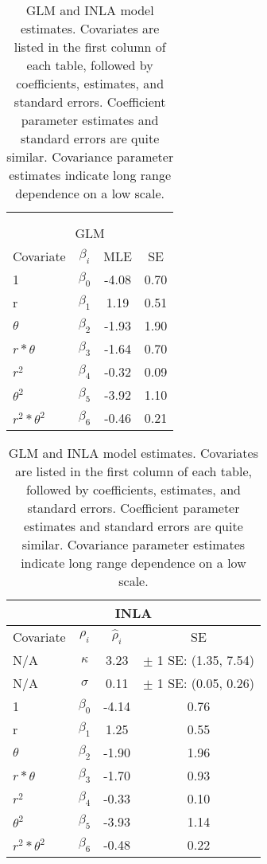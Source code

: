 \begin{table}
\begin{tabular}{| l | c | c | c |}
\hline
\multicolumn{4}{|c|}{} \\
\multicolumn{4}{|c|}{} \\
\multicolumn{4}{|c|}{GLM} \\
\hline
Covariate         & $\beta_{i}$ & MLE   & SE   \\ \hline
1                 & $\beta_{0}$ & -4.08 & 0.70 \\ \hline
r                 & $\beta_{1}$ &  1.19 & 0.51 \\ \hline
$\theta$          & $\beta_{2}$ & -1.93 & 1.90 \\ \hline
$r*\theta$        & $\beta_{3}$ & -1.64 & 0.70 \\ \hline
$r^{2}$           & $\beta_{4}$ & -0.32 & 0.09 \\ \hline
$\theta^{2}$      & $\beta_{5}$ & -3.92 & 1.10 \\ \hline
$r^{2}*\theta^{2}$& $\beta_{6}$ & -0.46 & 0.21 \\ \hline
\end{tabular}
\quad
\begin{tabular}{| l | c | c | c |}
\hline
\multicolumn{4}{|c|}{INLA} \\
\hline
Covariate         & $\rho _{i}$ & $\hat{\rho}_{i}$ & SE \\ \hline
N/A               & $\kappa$    &  3.23 & $\pm$ 1 SE: (1.35, 7.54) \\ \hline
N/A               & $\sigma$    &  0.11 & $\pm$ 1 SE: (0.05, 0.26) \\ \hline
1                 & $\beta_{0}$ & -4.14 & 0.76 \\ \hline
r                 & $\beta_{1}$ &  1.25 & 0.55 \\ \hline
$\theta$          & $\beta_{2}$ & -1.90 & 1.96 \\ \hline
$r*\theta$        & $\beta_{3}$ & -1.70 & 0.93 \\ \hline
$r^{2}$           & $\beta_{4}$ & -0.33 & 0.10 \\ \hline
$\theta^{2}$      & $\beta_{5}$ & -3.93 & 1.14 \\ \hline
$r^{2}*\theta^{2}$& $\beta_{6}$ & -0.48 & 0.22 \\ \hline 
\end{tabular} \\
\caption{GLM and INLA model estimates. Covariates are listed in the first column of each table, followed by coefficients, estimates, and standard errors. Coefficient parameter estimates and standard errors are quite similar. Covariance parameter estimates indicate long range dependence on a low scale.}
\end{table}

